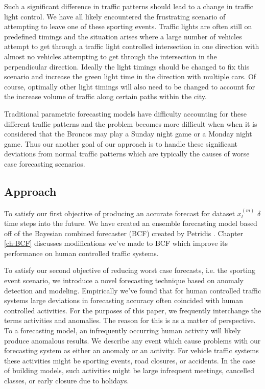 Such a significant difference in traffic patterns should lead to a change in traffic light control.  We have all likely encountered the frustrating scenario of attempting to leave one of these sporting events.  Traffic lights are often still on predefined timings and the situation arises where a large number of vehicles attempt to get through a traffic light controlled intersection in one direction with almost no vehicles attempting to get through the intersection in the perpendicular direction.  Ideally the light timings should be changed to fix this scenario and increase the green light time in the direction with multiple cars.  Of course, optimally other light timings will also need to be changed to account for the increase volume of traffic along certain paths within the city.

Traditional parametric forecasting models have difficulty accounting for these different traffic patterns and the problem becomes more difficult when when it is considered that the Broncos may play a Sunday night game or a Monday night game.  Thus our another goal of our approach is to handle these significant deviations from normal traffic patterns which are typically the causes of worse case forecasting scenarios.


\subsection{Approach}
To satisfy our first objective of producing an accurate forecast for dataset $x_{t}^{(m)}$ $\delta$ time steps into the future. We have created an ensemble forecasting model based off of the Bayesian combined forecaster (BCF) created by Petridis \cite{Petridis2001}.  Chapter \ref{ch:BCF} discusses modifications we've made to BCF which improve its performance on human controlled traffic systems.  

To satisfy our second objective of reducing worst case forecasts, i.e. the sporting event scenario, we introduce a novel forecasting technique based on anomaly detection and modeling.  Empirically we've found that for human controlled traffic systems large deviations in forecasting accuracy often coincided with human controlled activities.  For the purposes of this paper, we frequently interchange the terms activities and anomalies.  The reason for this is as a matter of perspective.  To a forecasting model, an infrequently occurring human activity will likely produce anomalous results.  We describe any event which cause problems with our forecasting system as either an anomaly or an activity.  For vehicle traffic systems these activities might be sporting events, road closures, or accidents.  In the case of building models, such activities might be large infrequent meetings, cancelled classes, or early closure due to holidays.

